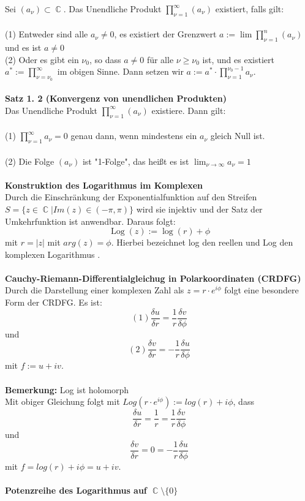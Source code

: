 \documentclass[10pt,a4paper]{article}
\DeclareMathOperator{\C}{\mathbb{C}}
\DeclareMathOperator{\Log}{Log}
\begin{document}
Sei $(a_{\nu})\subset \C$. Das Unendliche Produkt $\prod_{\nu = 1 }^{\infty}(a_{\nu})$ existiert, falls gilt:
\\
\\
(1) Entweder sind alle $a_{\nu}\neq 0$, es existiert der Grenzwert $ a := \lim \prod_{\nu = 1}^{n} (a_{\nu})$ und es ist $a \neq 0$
\\
(2) Oder es gibt ein $\nu_{0}$, so dass $a \neq 0$ für alle $\nu \geq \nu_{0}$ ist, und es existiert $a^{*} := \prod_{\nu = \nu_{0}}^{\infty}$ im obigen Sinne. Dann setzen wir $a := a^{*} 
\cdot \prod_{\nu = 1}^{\nu_{0} - 1}a_{\nu}$.
\\
\\
\textbf{Satz 1. 2 (Konvergenz von unendlichen Produkten)}
\\

Das Unendliche Produkt $\prod_{\nu = 1 }^{\infty}(a_{\nu})$ existiere. Dann gilt:
\\
\\
(1) $\prod_{\nu = 1}^{\infty}a_{\nu} = 0$ genau dann, wenn mindestens ein $a_{\nu}$ gleich Null ist.
\\
\\
(2) Die Folge $(a_{\nu})$ ist "1-Folge", das heißt es ist $\lim_{\nu \rightarrow\infty}a_{\nu} = 1$
\\
\\
\textbf{Konstruktion des Logarithmus im Komplexen}
\\

Durch die Einschränkung der Exponentialfunktion auf den Streifen $S = \{ z \in \C | Im(z) \in (-\pi, \pi)\}$ wird sie injektiv und der Satz der Umkehrfunktion ist anwendbar. Daraus folgt:$$\Log(z) := \log(r) + \phi$$ mit $r=|z|$ mit $arg(z)= \phi$. Hierbei bezeichnet log den reellen und Log den komplexen Logarithmus .
\\
\\
\textbf{Cauchy-Riemann-Differentialgleichug in Polarkoordinaten (CRDFG)}
\\

Durch die Darstellung einer komplexen Zahl als $z = r\cdot e^{i\phi}$ folgt eine besondere Form der CRDFG. Es ist: $$(1) \frac{\delta u}{\delta r} = \frac{1}{r} \frac{\delta v}{\delta \phi}$$ und $$(2)\frac{\delta v}{\delta r} = -\frac{1}{r} \frac{\delta u}{\delta \phi}$$ mit $f := u + iv$.
\\
\\
\textbf{Bemerkung:} Log ist holomorph
\\

Mit obiger Gleichung folgt mit $Log(r\cdot e^{i \phi}) := log(r) + i \phi$, dass $$\frac{\delta u}{\delta r} =\frac{1}{r} = \frac{1}{r} \frac{\delta v}{\delta \phi} $$ und $$\frac{\delta v}{\delta r} = 0=-\frac{1}{r} \frac{\delta u}{\delta \phi}$$ mit $f = log(r) + i\phi= u +iv$.
\\
\\
\textbf{Potenzreihe des Logarithmus auf $\C\setminus\{0\}$ }
\\
\end{document}
